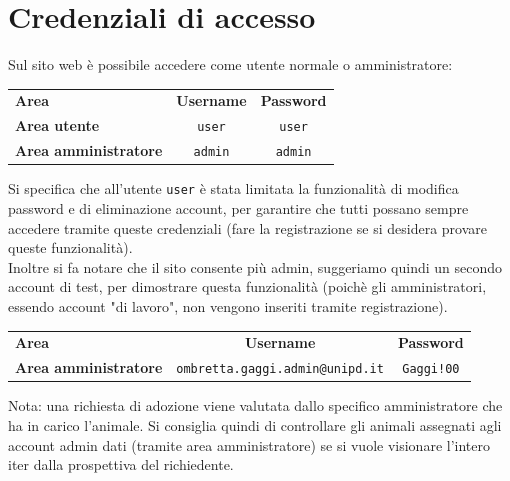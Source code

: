\section{Credenziali di accesso}
Sul sito web è possibile accedere come utente normale o amministratore:
\begin{center}
\begin{tabular}{|l|c|c|}
\hline
\rowcolor{brown}

\color{white}\textbf{Area} &
\color{white}\textbf{Username} &
\color{white}\textbf{Password} \\
\rowcolor{beige} 
\hline
\textbf{Area utente} & \texttt{user} & \texttt{user} \\
\rowcolor{beige} 
\hline
\textbf{Area amministratore} & \texttt{admin} & \texttt{admin} \\
\hline
\end{tabular}
\end{center}
Si specifica che all'utente \texttt{user} è stata limitata la funzionalità di modifica password e di eliminazione account, per garantire che tutti possano sempre accedere tramite queste credenziali (fare la registrazione se si desidera provare queste funzionalità).\\
Inoltre si fa notare che il sito consente più admin, suggeriamo quindi un secondo account di test, per dimostrare questa funzionalità (poichè gli amministratori, essendo account "di lavoro", non vengono inseriti tramite registrazione).
\begin{center}
\begin{tabular}{|l|c|c|}
\hline
\rowcolor{brown}
\color{white}\textbf{Area} &
\color{white}\textbf{Username} &
\color{white}\textbf{Password} \\
\rowcolor{beige} 
\hline
\textbf{Area amministratore} & \texttt{ombretta.gaggi.admin@unipd.it} & \texttt{Gaggi!00} \\
\hline
\end{tabular}
\end{center}
\begin{mdframed}[
    backgroundcolor=gray!15,
    linecolor=none,
    leftmargin=-3cm,
    rightmargin=-3cm,
    innerleftmargin=4cm,
    innerrightmargin=4cm,
    innertopmargin=10pt,
    innerbottommargin=10pt
    ]
\textmd{Nota: una richiesta di adozione viene valutata dallo specifico amministratore che ha in carico l'animale. Si consiglia quindi di controllare gli animali assegnati agli account admin dati (tramite area amministratore) se si vuole visionare l'intero iter dalla prospettiva del richiedente.}
\end{mdframed}
